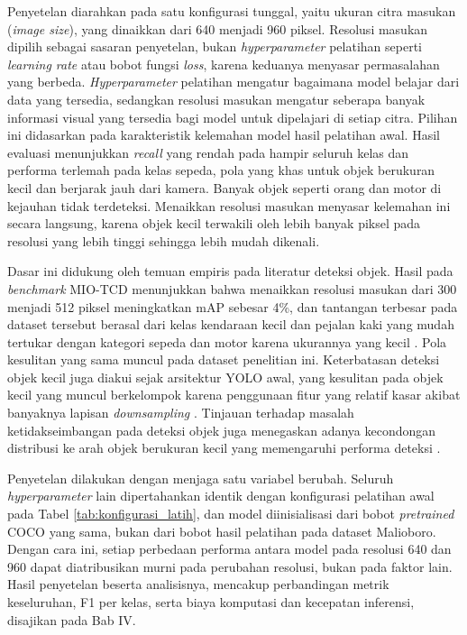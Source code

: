 Penyetelan diarahkan pada satu konfigurasi tunggal, yaitu ukuran citra masukan 
(\textit{image size}), yang dinaikkan dari 640 menjadi 960 piksel. Resolusi masukan 
dipilih sebagai sasaran penyetelan, bukan \textit{hyperparameter} pelatihan seperti 
\textit{learning rate} atau bobot fungsi \textit{loss}, karena keduanya menyasar 
permasalahan yang berbeda. \textit{Hyperparameter} pelatihan mengatur bagaimana model 
belajar dari data yang tersedia, sedangkan resolusi masukan mengatur seberapa banyak 
informasi visual yang tersedia bagi model untuk dipelajari di setiap citra. Pilihan ini 
didasarkan pada karakteristik kelemahan model hasil pelatihan awal. Hasil evaluasi menunjukkan 
\textit{recall} yang rendah pada hampir seluruh kelas dan performa terlemah pada kelas 
sepeda, pola yang khas untuk objek berukuran kecil dan berjarak jauh dari kamera. Banyak 
objek seperti orang dan motor di kejauhan tidak terdeteksi. Menaikkan resolusi masukan 
menyasar kelemahan ini secara langsung, karena objek kecil terwakili oleh lebih banyak 
piksel pada resolusi yang lebih tinggi sehingga lebih mudah dikenali.

Dasar ini didukung oleh temuan empiris pada literatur deteksi objek. Hasil pada 
\textit{benchmark} MIO-TCD menunjukkan bahwa menaikkan resolusi masukan dari 300 menjadi 
512 piksel meningkatkan mAP sebesar 4\%, dan tantangan terbesar pada dataset tersebut 
berasal dari kelas kendaraan kecil dan pejalan kaki yang mudah tertukar dengan kategori 
sepeda dan motor karena ukurannya yang kecil \cite{luo2018miotcd}. Pola kesulitan yang 
sama muncul pada dataset penelitian ini. Keterbatasan deteksi objek kecil juga diakui 
sejak arsitektur YOLO awal, yang kesulitan pada objek kecil yang muncul berkelompok karena 
penggunaan fitur yang relatif kasar akibat banyaknya lapisan \textit{downsampling} 
\cite{redmon2016yolo}. Tinjauan terhadap masalah ketidakseimbangan pada deteksi objek 
juga menegaskan adanya kecondongan distribusi ke arah objek berukuran kecil yang 
memengaruhi performa deteksi \cite{oksuz2021imbalance}.

Penyetelan dilakukan dengan menjaga satu variabel berubah. Seluruh \textit{hyperparameter} 
lain dipertahankan identik dengan konfigurasi pelatihan awal pada Tabel 
\ref{tab:konfigurasi_latih}, dan model diinisialisasi dari bobot \textit{pretrained} 
COCO yang sama, bukan dari bobot hasil pelatihan pada dataset Malioboro. Dengan cara ini, 
setiap perbedaan performa antara model pada resolusi 640 dan 960 dapat diatribusikan murni 
pada perubahan resolusi, bukan pada faktor lain. Hasil penyetelan beserta analisisnya, 
mencakup perbandingan metrik keseluruhan, F1 per kelas, serta biaya komputasi dan kecepatan 
inferensi, disajikan pada Bab IV.

